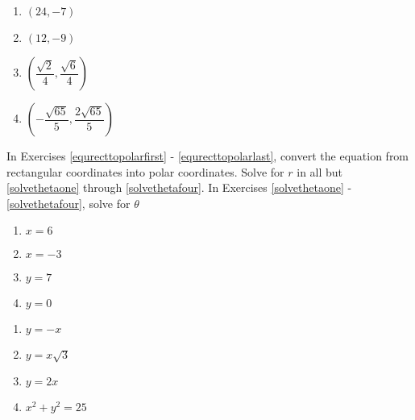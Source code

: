 \begin{multicols}{4} 

\begin{enumerate}

\setcounter{enumi}{\value{HW}}

\item  $\left(24, -7 \right)$ 
\item $\left(12, -9\right)$ 
\item $\left(\dfrac{\sqrt{2}}{4}, \dfrac{\sqrt{6}}{4}\right)$
\item  $\left(-\dfrac{\sqrt{65}}{5}, \dfrac{2\sqrt{65}}{5}\right)$ \label{recttopolarlast}

\setcounter{HW}{\value{enumi}}

\end{enumerate}

\end{multicols}

In Exercises \ref{equrecttopolarfirst} - \ref{equrecttopolarlast}, convert the equation from rectangular coordinates into polar coordinates.  Solve for $r$ in all but \ref{solvethetaone} through \ref{solvethetafour}.  In Exercises \ref{solvethetaone} - \ref{solvethetafour},  solve for $\theta$

\begin{multicols}{4}

\begin{enumerate}

\setcounter{enumi}{\value{HW}}

\item $x = 6$ \label{equrecttopolarfirst}
\item $x = -3$
\item $y = 7$
\item $y = 0$ \label{solvethetaone} 

\setcounter{HW}{\value{enumi}}

\end{enumerate}

\end{multicols}

\begin{multicols}{4} 

\begin{enumerate}

\setcounter{enumi}{\value{HW}}

\item $y = -x$  
\item $y = x\sqrt{3}$  
\item $y = 2x$ \label{solvethetafour} 
\item $x^2 + y^2 = 25$

\setcounter{HW}{\value{enumi}}

\end{enumerate}

\end{multicols}

